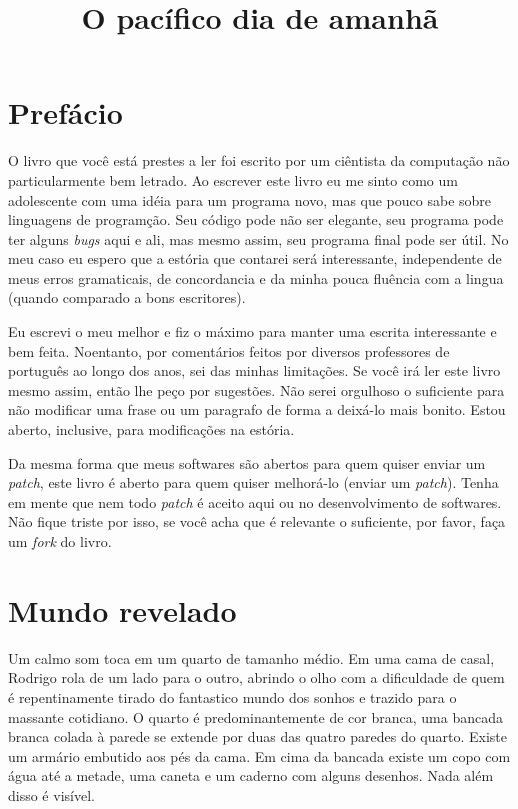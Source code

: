 \documentclass{book}
\title{O pacífico dia de amanhã}
\begin{document}
\chapter*{Prefácio}
O livro que você está prestes a ler foi escrito por um ciêntista da computação
não particularmente bem letrado. Ao escrever este livro eu me sinto como um
adolescente com uma idéia para um programa novo, mas que pouco sabe sobre
linguagens de programção. Seu código pode não ser elegante, seu programa pode
ter alguns \emph{bugs} aqui e ali, mas mesmo assim, seu programa final pode ser
útil. No meu caso eu espero que a estória que contarei será interessante,
independente de meus erros gramaticais, de concordancia e da minha pouca
fluência com a lingua (quando comparado a bons escritores).

Eu escrevi o meu melhor e fiz o máximo para manter uma escrita interessante e
bem feita. Noentanto, por comentários feitos por diversos professores de
português ao longo dos anos, sei das minhas limitações. Se você irá ler este
livro mesmo assim, então lhe peço por sugestões. Não serei orgulhoso o
suficiente para não modificar uma frase ou um paragrafo de forma a deixá-lo mais
bonito. Estou aberto, inclusive, para modificações na estória.

Da mesma forma que meus softwares são abertos para quem quiser enviar um
\emph{patch}, este livro é aberto para quem quiser melhorá-lo (enviar um
\emph{patch}). Tenha em mente que nem todo \emph{patch} é aceito aqui ou no
desenvolvimento de softwares. Não fique triste por isso, se você acha que é
relevante o suficiente, por favor, faça um \emph{fork} do livro.

\chapter{Mundo revelado}
Um calmo som toca em um quarto de tamanho médio. Em uma cama de casal, Rodrigo
rola de um lado para o outro, abrindo o olho com a dificuldade de quem é
repentinamente tirado do fantastico mundo dos sonhos e trazido para o massante
cotidiano. O quarto é predominantemente de cor branca, uma bancada branca colada
à parede se extende por duas das quatro paredes do quarto.  Existe um armário
embutido aos pés da cama. Em cima da bancada existe um copo com água até a
metade, uma caneta e um caderno com alguns desenhos. Nada além
disso é visível.
\end{document}
